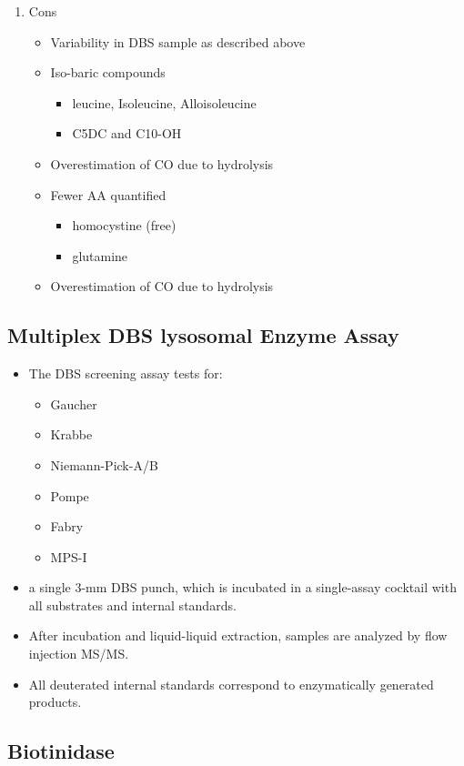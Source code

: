 \documentclass{scrartcl}
\begin{document}
\begin{enumerate}
\begin{enumerate}
\item Cons
\label{sec:orgd33347e}
\begin{itemize}
\item Variability in DBS sample as described above
\item Iso-baric compounds
\begin{itemize}
\item leucine, Isoleucine, Alloisoleucine
\item C5DC and C10-OH
\end{itemize}
\item Overestimation of CO due to hydrolysis
\item Fewer AA quantified
\begin{itemize}
\item homocystine (free)
\item glutamine
\end{itemize}
\item Overestimation of CO due to hydrolysis
\end{itemize}
\end{enumerate}
\end{enumerate}
\subsection{Multiplex DBS lysosomal Enzyme Assay}
\label{sec:org339245f}
\begin{itemize}
\item The DBS screening assay tests for:
\begin{itemize}
\item Gaucher
\item Krabbe
\item Niemann-Pick-A/B
\item Pompe
\item Fabry
\item MPS-I
\end{itemize}
\item a single 3-mm DBS punch, which is incubated in a single-assay
cocktail with all substrates and internal standards.
\item After incubation and liquid-liquid extraction, samples are analyzed by flow injection MS/MS.
\item All deuterated internal standards correspond to enzymatically generated products.
\end{itemize}
\subsection{Biotinidase}
\label{sec:org4e1f574}
\end{document}

